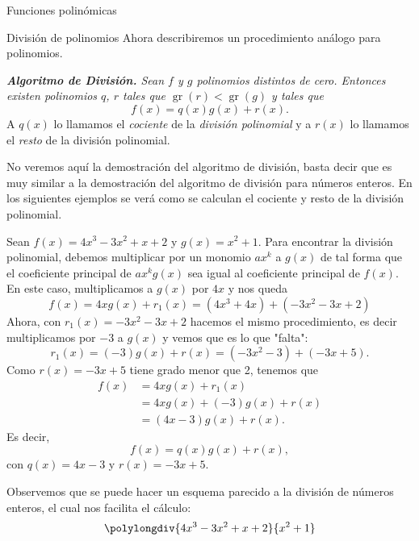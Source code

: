 \begin{chapter}{Funciones polinómicas}
\begin{section}{División de polinomios}
  Ahora describiremos un procedimiento análogo para polinomios.

  \textit{\textbf{Algoritmo de División.} Sean $f$ y $g$ polinomios distintos de cero. Entonces existen polinomios $q$, $r$ tales que $\operatorname{gr}(r) < \operatorname{gr}(g)$ y tales que}
  \begin{equation*}
      f (x) = q (x) g (x) + r (x).
  \end{equation*}
  A $q(x)$ lo llamamos el \textit{cociente} de la \textit{división polinomial} y  a $r(x)$ lo llamamos el \textit{resto}  de la división polinomial.

  No veremos aquí la demostración del algoritmo de división, basta decir que es muy similar a  la demostración del algoritmo de división para números enteros. En los siguientes ejemplos se verá como se calculan el cociente y resto de la división polinomial.

  \begin{ejemplo*} Sean $f(x) = 4x^3 - 3x^2 + x + 2$ y $g(x) = x^2 + 1$. Para encontrar la división polinomial, debemos multiplicar por un monomio $ax^k$ a $g(x)$ de tal forma que el coeficiente principal de  $ax^kg(x)$ sea igual al coeficiente principal de $f(x)$. En este caso, multiplicamos a $g(x)$ por $4x$ y nos queda
      \begin{equation*}
          f(x) = 4xg(x) + r_1(x) = (4x^3 +4x)+(-3x^2-3x +2)
      \end{equation*}
      Ahora,  con $r_1(x)=-3x^2-3x +2$ hacemos el mismo procedimiento,  es decir multiplicamos por $-3$  a $g(x)$ y vemos que es lo que "falta":
      \begin{equation*}
          r_1(x) = (-3)g(x) +r(x) = (-3x^2 -3) + (-3x+5).
      \end{equation*}
      Como $r(x) = -3x+5$ tiene grado menor que 2, tenemos que
      \begin{align*}
          f(x) & = 4xg(x) + r_1(x) \\ &=4xg(x) + (-3)g(x) +r(x)\\& = (4x-3)g(x)+r(x).
      \end{align*}
      Es decir,
      \begin{equation*}
          f(x) = q(x)g(x)+r(x),
      \end{equation*}
      con $q(x) =4x-3$ y $r(x) = -3x+5$.

      Observemos que se puede hacer un esquema parecido a  la división de números enteros, el cual nos facilita el cálculo:
      \begin{equation*}
          \polylongdiv{4x^3 - 3x^2 + x + 2}{ x^2 + 1}
      \end{equation*}
  \end{ejemplo*}


\end{section}
\end{chapter}
